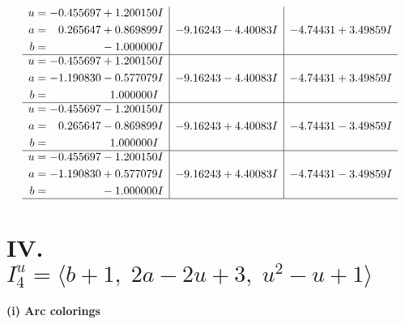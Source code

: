 \documentclass[1p]{elsarticle_modified}
\theoremstyle{definition}
\begin{document}
$$\begin{array}{c|c|c}
\begin{aligned}
u &= -0.455697 + 1.200150 I \\
a &= \phantom{-}0.265647 + 0.869899 I \\
b &= \phantom{-0.000000 } -1.000000 I\end{aligned}
 & -9.16243 - 4.40083 I & -4.74431 + 3.49859 I \\ \hline\begin{aligned}
u &= -0.455697 + 1.200150 I \\
a &= -1.190830 - 0.577079 I \\
b &= \phantom{-0.000000 -}1.000000 I\end{aligned}
 & -9.16243 - 4.40083 I & -4.74431 + 3.49859 I \\ \hline\begin{aligned}
u &= -0.455697 - 1.200150 I \\
a &= \phantom{-}0.265647 - 0.869899 I \\
b &= \phantom{-0.000000 -}1.000000 I\end{aligned}
 & -9.16243 + 4.40083 I & -4.74431 - 3.49859 I \\ \hline\begin{aligned}
u &= -0.455697 - 1.200150 I \\
a &= -1.190830 + 0.577079 I \\
b &= \phantom{-0.000000 } -1.000000 I\end{aligned}
 & -9.16243 + 4.40083 I & -4.74431 - 3.49859 I\\
 \hline 
 \end{array}$$\newpage\newpage\renewcommand{\arraystretch}{1}
\centering \section*{IV. $I^u_{4}= \langle b+1,\;2 a-2 u+3,\;u^2- u+1 \rangle$}
\flushleft \textbf{(i) Arc colorings}\\
\end{document}

